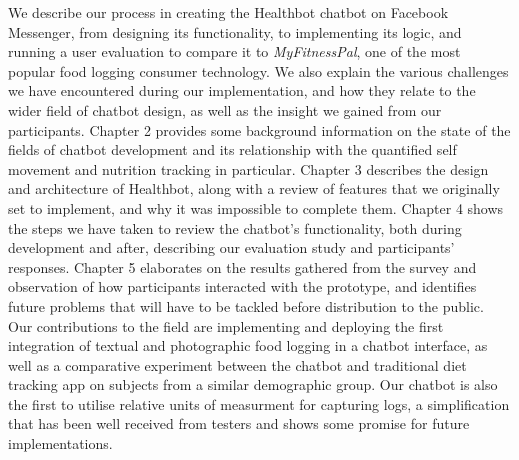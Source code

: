 We describe our process in creating the Healthbot chatbot on Facebook Messenger, from designing its functionality, to implementing its logic, and running a user evaluation to compare it to \textit{MyFitnessPal}, one of the most popular food logging consumer technology. We also explain the various challenges we have encountered during our implementation, and how they relate to the wider field of chatbot design, as well as the insight we gained from our participants. Chapter 2 provides some background information on the state of the fields of chatbot development and its relationship with the quantified self movement and nutrition tracking in particular. Chapter 3 describes the design and architecture of Healthbot, along with a review of features that we originally set to implement, and why it was impossible to complete them. Chapter 4 shows the steps we have taken to review the chatbot's functionality, both during development and after, describing our evaluation study and participants' responses. Chapter 5 elaborates on the results gathered from the survey and observation of how participants interacted with the prototype, and identifies future problems that will have to be tackled before distribution to the public.\\
Our contributions to the field are implementing and deploying the first integration of textual and photographic food logging in a chatbot interface, as well as a comparative experiment between the chatbot and traditional diet tracking app on subjects from a similar demographic group. Our chatbot is also the first to utilise relative units of measurment for capturing logs, a simplification that has been well received from testers and shows some promise for future implementations.
